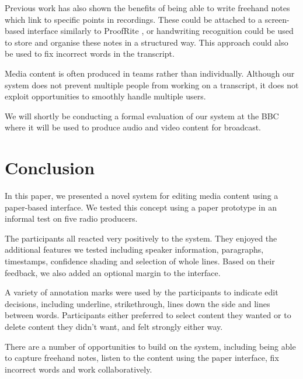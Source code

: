 Previous work has also shown the benefits of being able to write freehand notes
which link to specific points in recordings. These could be attached to a
screen-based interface similarly to ProofRite \citep{Conroy2004}, or handwriting
recognition could be used to store and organise these notes in a structured
way. This approach could also be used to fix incorrect words in the transcript.

Media content is often produced in teams rather than individually.  Although
our system does not prevent multiple people from working on a transcript, it
does not exploit opportunities to smoothly handle multiple users.

We will shortly be conducting a formal evaluation of our system at the BBC
where it will be used to produce audio and video content for broadcast. 


\section{Conclusion}
In this paper, we presented a novel system for editing media content using a
paper-based interface. We tested this concept using a paper prototype in an
informal test on five radio producers.

The participants all reacted very positively to the system. They enjoyed the
additional features we tested including speaker information, paragraphs,
timestamps, confidence shading and selection of whole lines. Based on their
feedback, we also added an optional margin to the interface.

A variety of annotation marks were used by the participants to indicate edit
decisions, including underline, strikethrough, lines down the side and lines
between words.  Participants either preferred to select content they wanted or
to delete content they didn't want, and felt strongly either way.

There are a number of opportunities to build on the system, including being
able to capture freehand notes, listen to the content using the paper
interface, fix incorrect words and work collaboratively.

